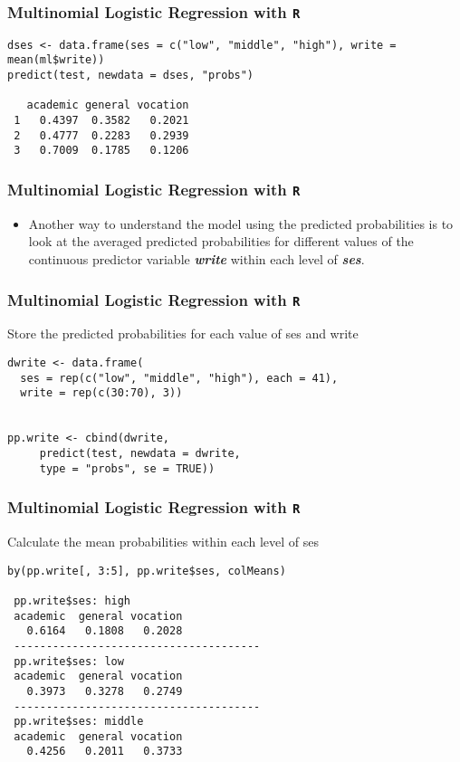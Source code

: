 \documentclass[00-GLMregslides.tex]{subfiles}
\begin{document}
\begin{frame}[fragile]

\frametitle{Multinomial Logistic Regression with \texttt{R}}
\Large
\begin{verbatim}
dses <- data.frame(ses = c("low", "middle", "high"), write = mean(ml$write))
predict(test, newdata = dses, "probs")
 
   academic general vocation
 1   0.4397  0.3582   0.2021
 2   0.4777  0.2283   0.2939
 3   0.7009  0.1785   0.1206
\end{verbatim}
\end{frame}
\begin{frame}[fragile]

\frametitle{Multinomial Logistic Regression with \texttt{R}}
\Large
\begin{itemize}
\item Another way to understand the model using the predicted probabilities is to look at the averaged predicted probabilities for different values 
of the continuous predictor variable \textbf{\textit{write}} within each level of \textbf{\textit{ses}}.
\end{itemize}

 
\end{frame}
\begin{frame}[fragile]

\frametitle{Multinomial Logistic Regression with \texttt{R}}
\large
Store the predicted probabilities for each value of ses and write
\begin{verbatim}
dwrite <- data.frame(
  ses = rep(c("low", "middle", "high"), each = 41),
  write = rep(c(30:70), 3))


pp.write <- cbind(dwrite, 
     predict(test, newdata = dwrite, 
     type = "probs", se = TRUE))
\end{verbatim}
\end{frame}
\begin{frame}[fragile]

\frametitle{Multinomial Logistic Regression with \texttt{R}}
\large
 Calculate the mean probabilities within each level of ses
\begin{verbatim}
by(pp.write[, 3:5], pp.write$ses, colMeans)
 
 pp.write$ses: high
 academic  general vocation 
   0.6164   0.1808   0.2028 
 --------------------------------------
 pp.write$ses: low
 academic  general vocation 
   0.3973   0.3278   0.2749 
 --------------------------------------
 pp.write$ses: middle
 academic  general vocation 
   0.4256   0.2011   0.3733
\end{verbatim}
\end{frame}
\end{document}

